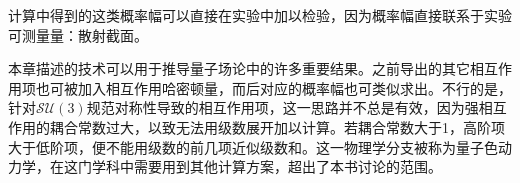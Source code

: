 {}

计算中得到的这类概率幅可以直接在实验中加以检验，因为概率幅直接联系于实验可测量量：散射截面。

本章描述的技术可以用于推导量子场论中的许多重要结果。之前导出的其它相互作用项也可被加入相互作用哈密顿量，而后对应的概率幅也可类似求出。不行的是，针对$\mathcal{SU}(3)$规范对称性导致的相互作用项，这一思路并不总是有效，因为强相互作用的耦合常数过大，以致无法用级数展开加以计算。若耦合常数大于1，高阶项大于低阶项，便不能用级数的前几项近似级数和。这一物理学分支被称为量子色动力学，在这门学科中需要用到其他计算方案，超出了本书讨论的范围。

